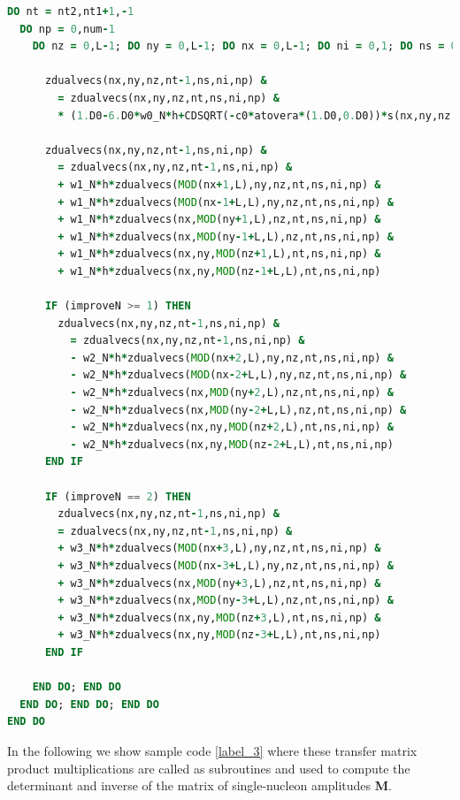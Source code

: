 \begin{lstlisting}[language=Fortran,caption=Sample code calculating 
the auxiliary-field transfer matrix multiplications on the right starting
from the single-nucleon final states,label={label_2}]
DO nt = nt2,nt1+1,-1
  DO np = 0,num-1   
    DO nz = 0,L-1; DO ny = 0,L-1; DO nx = 0,L-1; DO ni = 0,1; DO ns = 0,1
               
      zdualvecs(nx,ny,nz,nt-1,ns,ni,np) &
        = zdualvecs(nx,ny,nz,nt,ns,ni,np) &
        * (1.D0-6.D0*w0_N*h+CDSQRT(-c0*atovera*(1.D0,0.D0))*s(nx,ny,nz,nt-1))
               
      zdualvecs(nx,ny,nz,nt-1,ns,ni,np) &
        = zdualvecs(nx,ny,nz,nt-1,ns,ni,np) & 
        + w1_N*h*zdualvecs(MOD(nx+1,L),ny,nz,nt,ns,ni,np) &
        + w1_N*h*zdualvecs(MOD(nx-1+L,L),ny,nz,nt,ns,ni,np) &
        + w1_N*h*zdualvecs(nx,MOD(ny+1,L),nz,nt,ns,ni,np) &
        + w1_N*h*zdualvecs(nx,MOD(ny-1+L,L),nz,nt,ns,ni,np) &
        + w1_N*h*zdualvecs(nx,ny,MOD(nz+1,L),nt,ns,ni,np) &
        + w1_N*h*zdualvecs(nx,ny,MOD(nz-1+L,L),nt,ns,ni,np) 
               
      IF (improveN >= 1) THEN
        zdualvecs(nx,ny,nz,nt-1,ns,ni,np) &
          = zdualvecs(nx,ny,nz,nt-1,ns,ni,np) &
          - w2_N*h*zdualvecs(MOD(nx+2,L),ny,nz,nt,ns,ni,np) &
          - w2_N*h*zdualvecs(MOD(nx-2+L,L),ny,nz,nt,ns,ni,np) &
          - w2_N*h*zdualvecs(nx,MOD(ny+2,L),nz,nt,ns,ni,np) &
          - w2_N*h*zdualvecs(nx,MOD(ny-2+L,L),nz,nt,ns,ni,np) &
          - w2_N*h*zdualvecs(nx,ny,MOD(nz+2,L),nt,ns,ni,np) &
          - w2_N*h*zdualvecs(nx,ny,MOD(nz-2+L,L),nt,ns,ni,np) 
      END IF
               
      IF (improveN == 2) THEN
        zdualvecs(nx,ny,nz,nt-1,ns,ni,np) &
        = zdualvecs(nx,ny,nz,nt-1,ns,ni,np) &
        + w3_N*h*zdualvecs(MOD(nx+3,L),ny,nz,nt,ns,ni,np) &
        + w3_N*h*zdualvecs(MOD(nx-3+L,L),ny,nz,nt,ns,ni,np) &
        + w3_N*h*zdualvecs(nx,MOD(ny+3,L),nz,nt,ns,ni,np) &
        + w3_N*h*zdualvecs(nx,MOD(ny-3+L,L),nz,nt,ns,ni,np) &
        + w3_N*h*zdualvecs(nx,ny,MOD(nz+3,L),nt,ns,ni,np) &
        + w3_N*h*zdualvecs(nx,ny,MOD(nz-3+L,L),nt,ns,ni,np) 
      END IF
               
    END DO; END DO
  END DO; END DO; END DO
END DO

\end{lstlisting}

In the following we show sample code \ref{label_3} where these transfer matrix product multiplications are called as subroutines and used to compute the determinant and inverse of the matrix of single-nucleon amplitudes {\bf M}.  

